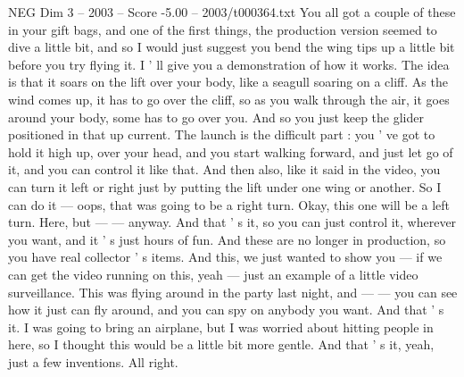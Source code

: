 \begin{textsample}{NEG Dim 3 – 2003 – Score -5.00 – 2003/t000364.txt}
You all got a couple of these in your gift bags, and one of the first things, the production version seemed to dive a little bit, and so I would just suggest you bend the wing tips up a little bit before you try flying it.
I ' ll give you a demonstration of how it works.
The idea is that it soars on the lift over your body, like a seagull soaring on a cliff.
As the wind comes up, it has to go over the cliff, so as you walk through the air, it goes around your body, some has to go over you.
And so you just keep the glider positioned in that up current.
The launch is the difficult part : you ' ve got to hold it high up, over your head, and you start walking forward, and just let go of it, and you can control it like that.
And then also, like it said in the video, you can turn it left or right just by putting the lift under one wing or another.
So I can do it — oops, that was going to be a right turn.
Okay, this one will be a left turn.
Here, but — — anyway.
And that ' s it, so you can just control it, wherever you want, and it ' s just hours of fun.
And these are no longer in production, so you have real collector ' s items.
And this, we just wanted to show you — if we can get the video running on this, yeah — just an example of a little video surveillance.
This was flying around in the party last night, and — — you can see how it just can fly around, and you can spy on anybody you want.
And that ' s it.
I was going to bring an airplane, but I was worried about hitting people in here, so I thought this would be a little bit more gentle.
And that ' s it, yeah, just a few inventions.
All right.

\end{textsample}
